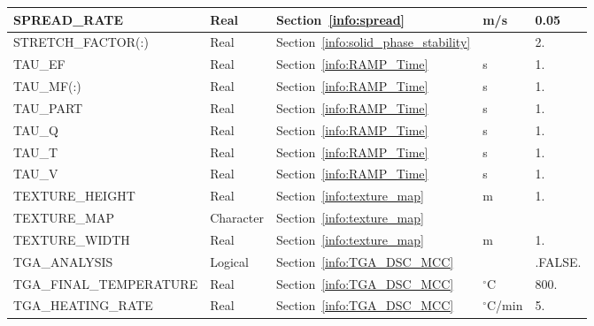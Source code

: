 \documentclass[11pt]{book}
\begin{document}
\begin{longtable}{@{\extracolsep{\fill}}|l|l|l|l|l|}
{\ct SPREAD\_RATE}                    & Real            & Section~\ref{info:spread}                 & m/s                 & 0.05                    \\ \hline
{\ct STRETCH\_FACTOR(:) }             & Real            & Section~\ref{info:solid_phase_stability}  &                     & 2.                      \\ \hline
{\ct TAU\_EF}                         & Real            & Section~\ref{info:RAMP_Time}              & s                   & 1.                      \\ \hline
{\ct TAU\_MF(:)}                      & Real            & Section~\ref{info:RAMP_Time}              & s                   & 1.                      \\ \hline
{\ct TAU\_PART}                       & Real            & Section~\ref{info:RAMP_Time}              & s                   & 1.                      \\ \hline
{\ct TAU\_Q}                          & Real            & Section~\ref{info:RAMP_Time}              & s                   & 1.                      \\ \hline
{\ct TAU\_T}                          & Real            & Section~\ref{info:RAMP_Time}              & s                   & 1.                      \\ \hline
{\ct TAU\_V}                          & Real            & Section~\ref{info:RAMP_Time}              & s                   & 1.                      \\ \hline
{\ct TEXTURE\_HEIGHT}                 & Real            & Section~\ref{info:texture_map}            & m                   & 1.                      \\ \hline
{\ct TEXTURE\_MAP}                    & Character       & Section~\ref{info:texture_map}            &                     &                         \\ \hline
{\ct TEXTURE\_WIDTH}                  & Real            & Section~\ref{info:texture_map}            & m                   & 1.                      \\ \hline
{\ct TGA\_ANALYSIS}                   & Logical         & Section~\ref{info:TGA_DSC_MCC}            &                     & {\ct .FALSE.}           \\ \hline
{\ct TGA\_FINAL\_TEMPERATURE}         & Real            & Section~\ref{info:TGA_DSC_MCC}            & $^\circ$C           & 800.                    \\ \hline
{\ct TGA\_HEATING\_RATE}              & Real            & Section~\ref{info:TGA_DSC_MCC}            & $^\circ$C/min       & 5.                      \\ \hline

\end{longtable}
\end{document}
